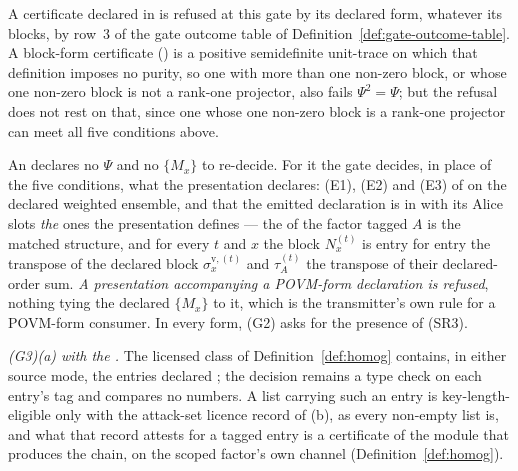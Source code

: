 \begin{definition}
A certificate declared in  is refused at this gate by its
declared form, whatever its blocks, by row~3 of the gate outcome table of
Definition~\ref{def:gate-outcome-table}. A block-form
certificate () is a positive semidefinite
unit-trace  on which that definition imposes no purity, so
one with more than one non-zero block, or whose one non-zero block is not a
rank-one projector, also fails $\Psi^2=\Psi$; but the refusal does not rest on
that, since one whose one non-zero block is a rank-one projector can meet all
five conditions above.

An  declares no $\Psi$ and no $\{M_x\}$ to
re-decide. For it the gate decides, in place of the five conditions, what the
presentation declares: (E1), (E2) and (E3) of 
on the declared weighted ensemble, and that the emitted declaration is in
 with its Alice slots \emph{the} ones the presentation
defines --- the  of the factor tagged $A$ is the
matched structure, and for every $t$ and $x$ the block $N^{(t)}_x$ is entry
for entry the transpose of the declared block $\sigma^{\mathrm v,(t)}_x$ and
$\tau^{(t)}_A$ the transpose of their declared-order sum. \emph{A presentation
accompanying a POVM-form declaration is refused}, nothing tying the declared
$\{M_x\}$ to it, which is the transmitter's own rule for a POVM-form consumer.
In every form, (G2) asks for the presence of (SR3).

\emph{(G3)(a) with the .} The licensed class of
Definition~\ref{def:homog} contains, in either source mode, the entries
declared ; the decision remains a type check on each
entry's tag and compares no numbers. A list carrying such an entry is
key-length-eligible only with the attack-set licence record of (b), as every
non-empty list is, and what that record attests for a tagged entry is a
certificate of the module that produces the chain, on the scoped factor's own
channel (Definition~\ref{def:homog}).
\end{definition}
